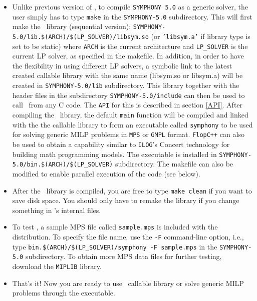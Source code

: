 \begin{itemize}

      \item Unlike previous version of \BB, to compile \texttt{SYMPHONY 5.0} as 
a generic solver, the user simply has to type \texttt{make} in the 
\texttt{SYMPHONY-5.0} subdirectory. This will 
first make the \BB\ library (sequential version): 
\texttt{SYMPHONY-5.0/lib.\$(ARCH)/\$(LP\_SOLVER)/libsym.so} (or 
\texttt{'libsym.a'} if library type is set to be static) where 
\texttt{ARCH} is the current architecture and \texttt{LP\_SOLVER} is the 
current LP solver, as specified in the makefile. In addition, in order 
to have the flexibility in using different LP solvers, a symbolic link to the 
latest created callable library with the same name (libsym.so or libsym.a) 
will be created in \texttt{SYMPHONY-5.0/lib} subdirectory. This library 
together with the header files in the subdirectory 
\texttt{SYMPHONY-5.0/include} can then be used to call \BB\ from any C code. 
The \texttt{API} for this is described in section \ref{API}.
After compiling the \BB\ library, the default \texttt{main} function will 
be compiled and linked with the the callable library to form an executable
called \texttt{symphony} to be used for solving generic MILP problems 
in \texttt{MPS} or \texttt{GMPL} format. \texttt{FlopC++} can also be used to 
obtain a capability similar to \texttt{ILOG}'s Concert technology for building 
math programming models. The executable is installed in 
\texttt{SYMPHONY-5.0/bin.\$(ARCH)/\$(LP\_SOLVER)} subdirectory. The makefile 
can also be modified to enable parallel execution of the code (see below).


\item After the \BB\ library is compiled, you are free to type {\tt make
        clean} if you want to save disk space. You should only have to
        remake the library if you change something in \BB's internal files. 

\item To test \BB, a sample MPS file called \texttt{sample.mps} is 
included with the distribution. To specify the file name, use the 
\texttt{-F} command-line option, i.e., type 
\texttt{bin.\$(ARCH)/\$(LP\_SOLVER)/symphony -F sample.mps} in the
\texttt{SYMPHONY-5.0} subdirectory. To obtain more MPS data files for further
testing, download the \texttt{MIPLIB} library.

\item That's it! Now you are ready to use \BB\ callable library or 
solve generic MILP problems through the executable.

\end{itemize}

